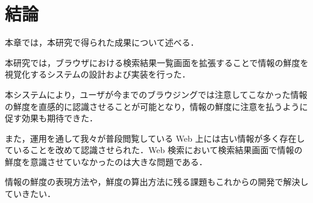\chapter{結論}
\label{chap:conclusion}

本章では，本研究で得られた成果について述べる．

\newpage

本研究では，ブラウザにおける検索結果一覧画面を拡張することで情報の鮮度を視覚化するシステムの設計および実装を行った．

本システムにより，ユーザが今までのブラウジングでは注意してこなかった情報の鮮度を直感的に認識させることが可能となり，情報の鮮度に注意を払うように促す効果も期待できた．

また，運用を通して我々が普段閲覧している Web 上には古い情報が多く存在していることを改めて認識させられた．Web 検索において検索結果画面で情報の鮮度を意識させていなかったのは大きな問題である．

情報の鮮度の表現方法や，鮮度の算出方法に残る課題もこれからの開発で解決していきたい．
